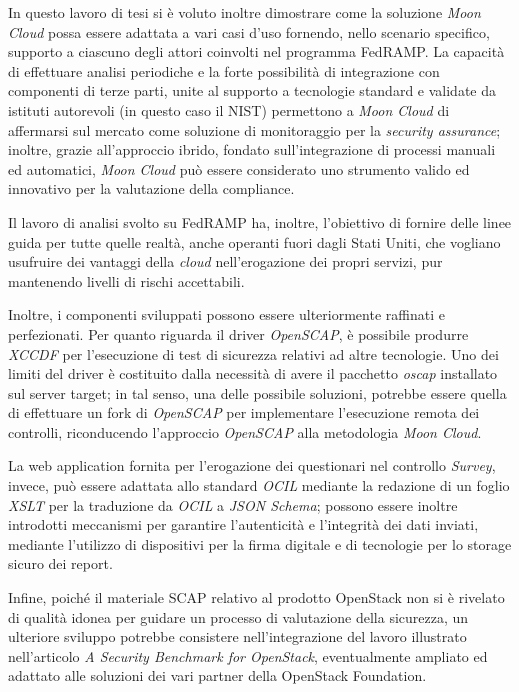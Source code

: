 \documentclass[../main.tex]{subfiles}
\begin{document}
In questo lavoro di tesi si è voluto inoltre dimostrare come la soluzione \textit{Moon Cloud} possa essere adattata a vari casi d'uso fornendo, nello scenario specifico, supporto a ciascuno degli attori coinvolti nel programma FedRAMP.
La capacità di effettuare analisi periodiche e la forte possibilità di integrazione con componenti di terze parti, unite al supporto a tecnologie standard e validate da istituti autorevoli (in questo caso il NIST) permettono a \textit{Moon Cloud} di affermarsi sul mercato come soluzione di monitoraggio per la \textit{security assurance}; inoltre, grazie all'approccio ibrido, fondato sull'integrazione di processi manuali ed automatici, \textit{Moon Cloud} può essere considerato uno strumento valido ed innovativo per la valutazione della compliance.

Il lavoro di analisi svolto su FedRAMP ha, inoltre, l'obiettivo di fornire delle linee guida per tutte quelle realtà, anche operanti fuori dagli Stati Uniti, che vogliano usufruire dei vantaggi della \textit{cloud} nell'erogazione dei propri servizi, pur mantenendo livelli di rischi accettabili. 

Inoltre, i componenti sviluppati possono essere ulteriormente raffinati e perfezionati.
Per quanto riguarda il driver \textit{OpenSCAP}, è possibile produrre \textit{XCCDF} per l'esecuzione di test di sicurezza relativi ad altre tecnologie.
Uno dei limiti del driver è costituito dalla necessità di avere il pacchetto \textit{oscap} installato sul server target; in tal senso, una delle possibile soluzioni, potrebbe essere quella di effettuare un fork di \textit{OpenSCAP} per implementare l'esecuzione remota dei controlli, riconducendo l'approccio \textit{OpenSCAP} alla metodologia \textit{Moon Cloud}.

La web application fornita per l'erogazione dei questionari nel controllo \textit{Survey}, invece, può essere adattata allo standard \textit{OCIL} mediante la redazione di un foglio \textit{XSLT} per la traduzione da \textit{OCIL} a \textit{JSON Schema}; possono essere inoltre introdotti meccanismi per garantire l'autenticità e l'integrità dei dati inviati, mediante l'utilizzo di dispositivi per la firma digitale e di tecnologie per lo storage sicuro dei report.

Infine, poiché il materiale SCAP relativo al prodotto OpenStack non si è rivelato di qualità idonea per guidare un processo di valutazione della sicurezza, un ulteriore sviluppo potrebbe consistere nell'integrazione del lavoro illustrato nell'articolo \textit{A Security Benchmark for OpenStack}, eventualmente ampliato ed adattato alle soluzioni dei vari partner della OpenStack Foundation.
\end{document}

